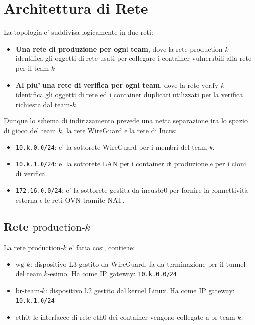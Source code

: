 \section{Architettura di Rete}\label{architettura-di-rete}

La topologia e' suddivisa logicamente in due reti:

\begin{itemize}
\tightlist
\item
  \textbf{Una rete di produzione per ogni team}, dove la rete
  \(\text{production-}k\) identifica gli oggetti di rete usati per
  collegare i container vulnerabili alla rete per il team \(k\)
\item
  \textbf{Al piu' una rete di verifica per ogni team}, dove la rete
  \(\text{verify-}k\) identifica gli oggetti di rete ed i container
  duplicati utilizzati per la verifica richiesta dal \(\text{team-}k\)
\end{itemize}

Dunque lo schema di indirizzamento prevede una netta separazione tra lo
spazio di gioco del team \(k\), la rete WireGuard e la rete di Incus:

\begin{itemize}
\tightlist
\item
  \passthrough{\lstinline!10.k.0.0/24!}: e' la sottorete WireGuard per i
  membri del team \(k\).
\item
  \passthrough{\lstinline!10.k.1.0/24!}: e' la sottorete LAN per i
  container di produzione e per i cloni di verifica.
\item
  \passthrough{\lstinline!172.16.0.0/24!}: e' la sottorete gestita da
  \(\text{incusbr0}\) per fornire la connettività esterna e le reti OVN
  tramite NAT.
\end{itemize}

\subsection{\texorpdfstring{Rete
\(\text{production-}k\)}{Rete \textbackslash text\{production-\}k}}\label{rete-textproduction-k}

La rete \(\text{production-}k\) e' fatta cosi, contiene:

\begin{itemize}
\tightlist
\item
  \(\text{wg-}k\): dispositivo L3 gestito da WireGuard, fa da
  terminazione per il tunnel del team \(k\)-esimo. Ha come IP gateway:
  \passthrough{\lstinline!10.k.0.0/24!}
\item
  \(\text{br-team-}k\): dispositivo L2 gestito dal kernel Linux. Ha come
  IP gateway: \passthrough{\lstinline!10.k.1.0/24!}
\item
  \(\text{eth0}\): le interfacce di rete \(\text{eth0}\) dei container
  vengono collegate a \(\text{br-team-}k\).
\end{itemize}

